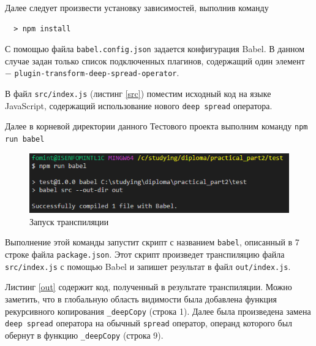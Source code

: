 \documentclass[14pt, a4paper]{article}
\def\code#1{\texttt{#1}} %
\begin{document}

Далее следует произвести установку зависимостей, выполнив команду
\begin{lstlisting}
  > npm install
\end{lstlisting}

С помощью файла \code{babel.config.json} задается конфигурация Babel. В данном случае задан только 
список подключенных плагинов, содержащий один элемент $-$ \code{plugin-transform-deep-spread-operator}.




В файл \code{src/index.js} (листинг \ref{src}) поместим исходный код на языке JavaScript, содержащий 
использование нового \code{deep spread} оператора.



Далее в корневой директории данного Тестового проекта выполним команду \code{npm run babel}

\begin{figure}[H]
  \centering
  \includegraphics[scale=1.0]{img/test_run_babel.PNG}
  \caption{Запуск транспиляции}
  \label{test_run_babel}
\end{figure}

Выполнение этой команды запустит скрипт с названием \code{babel}, описанный в 7 строке файла 
\code{package.json}. Этот скрипт произведет транспиляцию файла \code{src/index.js} с помощью Babel и 
запишет результат в файл \code{out/index.js}. 



Листинг \ref{out} содержит код, полученный в результате транспиляции. Можно заметить, что в глобальную
область видимости была добавлена функция рекурсивного копирования \code{\_deepCopy} (строка 1). 
Далее была произведена замена \code{deep spread} оператора на обычный \code{spread} оператор, операнд
которого был обернут в функцию \code{\_deepCopy} (строка 9). 
\end{document}
